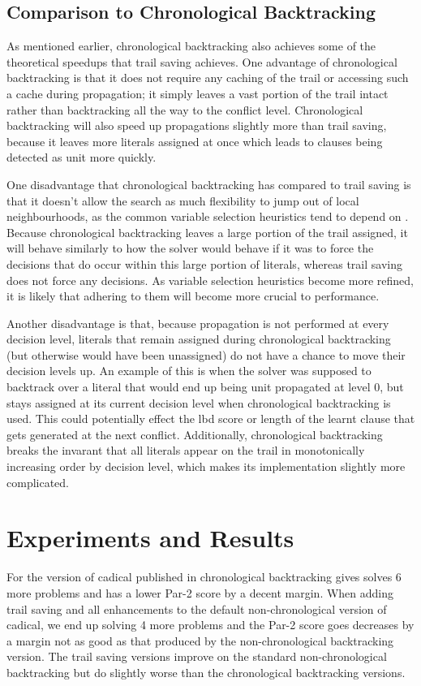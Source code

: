 \documentclass[runningheads]{llncs}
\begin{document}
\subsection{Comparison to Chronological Backtracking}
As mentioned earlier, chronological backtracking also achieves some of
the theoretical speedups that trail saving achieves. One advantage of
chronological backtracking is that it does not require any caching of
the trail or accessing such a cache during propagation; it simply
leaves a vast portion of the trail intact rather than backtracking all
the way to the conflict level. Chronological backtracking will also
speed up propagations slightly more than trail saving, because it
leaves more literals assigned at once which leads to clauses being
detected as unit more quickly.

One disadvantage that chronological backtracking has compared to trail
saving is that it doesn't allow the search as much flexibility to jump
out of local neighbourhoods, as the common variable selection
heuristics tend to depend on
\cite{DBLP:conf/dac/MoskewiczMZZM01,DBLP:conf/sat/2015,DBLP:conf/sat/LiangGPC16}. Because
chronological backtracking leaves a large portion of the trail
assigned, it will behave similarly to how the solver would behave if
it was to force the decisions that do occur within this large portion
of literals, whereas trail saving does not force any decisions. As
variable selection heuristics become more refined, it is likely that
adhering to them will become more crucial to performance.

Another disadvantage is that, because propagation is not performed at
every decision level, literals that remain assigned during
chronological backtracking (but otherwise would have been unassigned)
do not have a chance to move their decision levels up. An example of
this is when the solver was supposed to backtrack over a literal that
would end up being unit propagated at level 0, but stays assigned at
its current decision level when chronological backtracking is
used. This could potentially effect the lbd score or length of the
learnt clause that gets generated at the next conflict. Additionally,
chronological backtracking breaks the invarant that all literals
appear on the trail in monotonically increasing order by decision
level, which makes its implementation slightly more complicated.

\section{Experiments and Results}
For the version of cadical published in
\cite{DBLP:conf/sat/MohleB19}chronological backtracking gives solves 6
more problems and has a lower Par-2 score by a decent margin. When
adding trail saving and all enhancements to the default
non-chronological version of cadical, we end up solving 4 more problems
and the Par-2 score goes decreases by a margin not as good as that
produced by the non-chronological backtracking version. The trail saving
versions improve on the standard non-chronological backtracking but do
slightly worse than the chronological backtracking versions.
\end{document}
